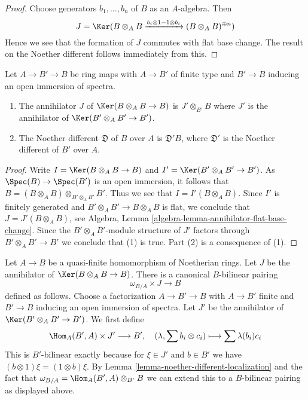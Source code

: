 \begin{proof}
Choose generators $b_1, \ldots, b_n$ of $B$ as an $A$-algebra.
Then
$$
J = \Ker(B \otimes_A B \xrightarrow{b_i \otimes 1 - 1 \otimes b_i}
(B \otimes_A B)^{\oplus n})
$$
Hence we see that the formation of $J$ commutes with flat base change.
The result on the Noether different follows immediately from this.
\end{proof}

\begin{lemma}
\label{lemma-noether-different-localization}
Let $A \to B' \to B$ be ring maps with $A \to B'$
of finite type and $B' \to B$ inducing an open immersion of spectra.
\begin{enumerate}
\item The annihilator $J$ of $\Ker(B \otimes_A B \to B)$ is
$J' \otimes_{B'} B$ where $J'$ is the annihilator of
$\Ker(B' \otimes_A B' \to B')$.
\item The Noether different $\mathfrak{D}$ of $B$ over $A$ is
$\mathfrak{D}'B$, where $\mathfrak{D}'$ is
the Noether different of $B'$ over $A$.
\end{enumerate}
\end{lemma}

\begin{proof}
Write $I = \Ker(B \otimes_A B \to B)$ and $I' = \Ker(B' \otimes_A B' \to B')$.
As $\Spec(B) \to \Spec(B')$ is an open immersion, it follows that
$B = (B \otimes_A B) \otimes_{B' \otimes_A B'} B'$. Thus we see that
$I = I'(B \otimes_A B)$. Since $I'$ is finitely generated and
$B' \otimes_A B' \to B \otimes_A B$ is flat, we conclude that
$J = J'(B \otimes_A B)$, see
Algebra, Lemma \ref{algebra-lemma-annihilator-flat-base-change}.
Since the $B' \otimes_A B'$-module structure of $J'$
factors through $B' \otimes_A B' \to B'$ we conclude that (1) is true.
Part (2) is a consequence of (1).
\end{proof}

\begin{remark}
\label{remark-construction-pairing}
Let $A \to B$ be a quasi-finite homomorphism of Noetherian rings.
Let $J$ be the annihilator of $\Ker(B \otimes_A B \to B)$.
There is a canonical $B$-bilinear pairing
\begin{equation}
\label{equation-pairing-noether}
\omega_{B/A} \times J \longrightarrow B
\end{equation}
defined as follows. Choose a factorization $A \to B' \to B$
with $A \to B'$ finite and $B' \to B$ inducing an open immersion
of spectra. Let $J'$ be the annihilator of $\Ker(B' \otimes_A B' \to B')$.
We first define
$$
\Hom_A(B', A) \times J' \longrightarrow B',\quad
(\lambda, \sum b_i \otimes c_i) \longmapsto \sum \lambda(b_i)c_i
$$
This is $B'$-bilinear exactly because for $\xi \in J'$ and $b \in B'$
we have $(b \otimes 1)\xi = (1 \otimes b)\xi$. By
Lemma \ref{lemma-noether-different-localization}
and the fact that $\omega_{B/A} = \Hom_A(B', A) \otimes_{B'} B$
we can extend this to a $B$-bilinear pairing as displayed above.
\end{remark}

